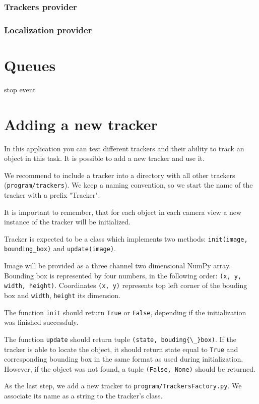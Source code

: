 \subsubsection*{Trackers provider}



\subsubsection*{Localization provider}

\section{Queues}

stop event

\section{Adding a new tracker}
In this application you can test different trackers and their ability to track
an object in this task. It is possible to add a new tracker and use it.

We recommend to include a tracker into a directory with all other trackers
(\verb+program/trackers+). We keep a naming convention, so we start the name of
the tracker with a prefix "Tracker".

It is important to remember, that for each object in each camera view a new
instance of the tracker will be initialized.

Tracker is expected to be a class which implements two methods:
\verb+init(image, bounding_box)+ and \verb+update(image)+.

Image will be provided as a three channel two dimensional NumPy array. Bounding
box is represented by four numbers, in the following order:
\verb+(x, y, width, height)+. Coordinates \verb+(x, y)+ represents top left corner of the bouding
box and \verb+width+, \verb+height+ its dimension.

The function \verb+init+ should return \verb+True+ or \verb+False+, depending
if the initialization was finished successfuly.

The function \verb+update+ should return tuple \verb+(state, bouding{\_}box)+.
If the tracker is able to locate the object, it should return state equal to
\verb+True+ and corresponding bounding box in the same format as used during
initialization. However, if the object was not found, a tuple \verb+(False, None)+ should be returned.

As the last step, we add a new tracker to \verb+program/TrackersFactory.py+. We
associate its name as a string to the tracker's class.
